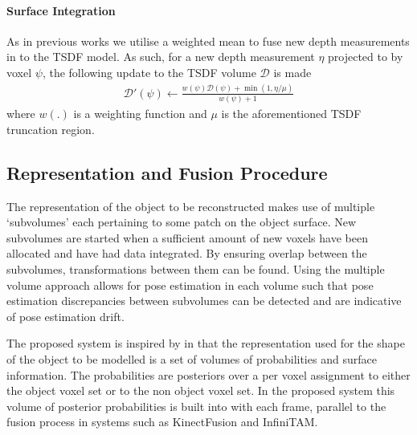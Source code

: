 \paragraph{Surface Integration}
As in previous works \cite{Newcombe2011,Prisacariu2014} we utilise a weighted mean to fuse new depth measurements in to the TSDF model. As such, 
for a new depth measurement $\eta$ projected to by voxel $\psi$, the following update to the TSDF volume $\mathcal{D}$ is made
\begin{equation}
\begin{split}
\mathcal{D}'(\psi) \leftarrow \frac{w(\psi)\mathcal{D}(\psi) + \min(1, \eta/\mu)}{w(\psi) + 1}
\end{split}
\end{equation}
where $w(.)$ is a weighting function and $\mu$ is the aforementioned TSDF truncation region.

\subsection{Representation and Fusion Procedure}
The representation of the object to be reconstructed makes use of multiple `subvolumes' each pertaining to some patch on the object surface. 
New subvolumes are started when a sufficient amount of new voxels have been allocated and have had data integrated. By ensuring overlap 
between the subvolumes, transformations between them can be found. Using the multiple volume approach allows for pose estimation in each 
volume such that pose estimation discrepancies between subvolumes can be detected and are indicative of pose estimation drift.

The proposed system is inspired by\cite{Kolev2006} in that the representation used for the shape of the object to be modelled is a set of volumes 
of probabilities and surface information. The probabilities are posteriors over a per voxel assignment to either the object voxel set or to the non 
object voxel set. In the proposed system this volume of posterior probabilities is built into with each frame, parallel to the fusion process in systems 
such as KinectFusion\cite{Newcombe2011} and InfiniTAM\cite{Prisacariu2014}.

